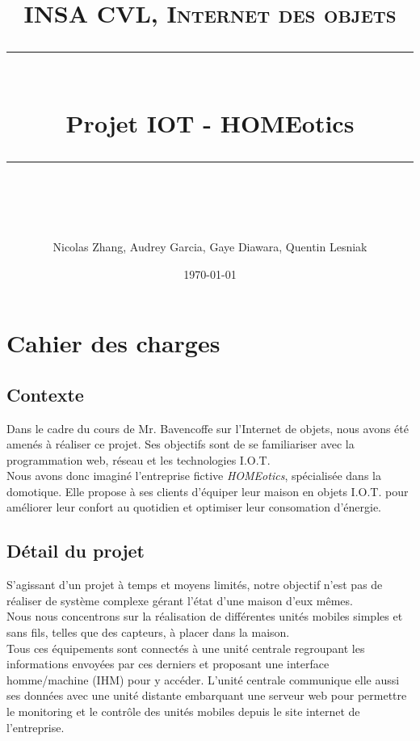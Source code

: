 \documentclass[11pt]{scrartcl} %
\title{	
	\normalfont\normalsize
	\vspace{\fill} %
	\textsc{INSA CVL, Internet des objets}\\ %
	\vspace{25pt} %
	\rule{\linewidth}{0.5pt}\\ %
	\vspace{20pt} %
	{\huge Projet IOT - HOMEotics}\\ %
	\vspace{12pt} %
	\rule{\linewidth}{2pt}\\ %
	\vspace{12pt} %
}
\author{Nicolas Zhang, Audrey Garcia, Gaye Diawara, Quentin Lesniak} %
\date{\normalsize\today\vspace{\fill}} %
\begin{document}
\maketitle %
\newpage


\section{Cahier des charges}

\subsection{Contexte}

Dans le cadre du cours de Mr. Bavencoffe sur l'Internet de objets, nous avons été amenés à réaliser ce projet. Ses objectifs sont de se familiariser avec la programmation web, réseau et les technologies I.O.T.\\
Nous avons donc imaginé l'entreprise fictive \textit{HOMEotics}, spécialisée dans la domotique. Elle propose à ses clients d'équiper leur maison en objets I.O.T. pour améliorer leur confort au quotidien et optimiser leur consomation d'énergie.


\subsection{Détail du projet}

S'agissant d'un projet à temps et moyens limités, notre objectif n'est pas de réaliser de système complexe gérant l'état d'une maison d'eux mêmes.\\
Nous nous concentrons sur la réalisation de différentes unités mobiles simples et sans fils, telles que des capteurs, à placer dans la maison.\\
Tous ces équipements sont connectés à une unité centrale regroupant les informations envoyées par ces derniers et proposant une interface homme/machine (IHM) pour y accéder.
L'unité centrale communique elle aussi ses données avec une unité distante embarquant une serveur web pour permettre le monitoring et le contrôle des unités mobiles depuis le site internet de l'entreprise.

\end{document}

